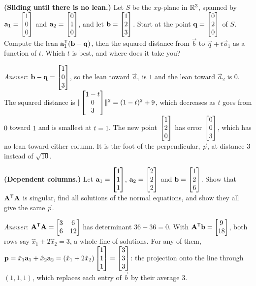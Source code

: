 \begin{exercise}\label{ch18:ex-lean}
\textbf{(Sliding until there is no lean.)} Let $S$ be the $xy$-plane in $\mathbb{R}^3$, spanned by
$\mathbf{a}_1=\begin{bmatrix}1\\0\\0\end{bmatrix}$ and $\mathbf{a}_2=\begin{bmatrix}0\\1\\0\end{bmatrix}$, and let $\mathbf{b}=\begin{bmatrix}1\\2\\3\end{bmatrix}$.
Start at the point $\mathbf{q}=\begin{bmatrix}0\\2\\0\end{bmatrix}$ of $S$. Compute the lean $\mathbf{a}_1^{\mathsf{T}}(\mathbf{b}-\mathbf{q})$,
then the squared distance from $\vec{b}$ to $\vec{q}+t\vec{a}_1$ as a function of $t$. Which $t$ is
best, and where does it take you?

\smallskip
\emph{Answer}: $\mathbf{b}-\mathbf{q}=\begin{bmatrix}1\\0\\3\end{bmatrix}$, so the lean toward $\vec{a}_1$ is $1$ and the
lean toward $\vec{a}_2$ is $0$. The squared distance is
$\lVert\begin{bmatrix}1-t\\0\\3\end{bmatrix}\rVert^2=(1-t)^2+9$, which decreases as $t$ goes from $0$ toward $1$ and is
smallest at $t=1$. The new point $\begin{bmatrix}1\\2\\0\end{bmatrix}$ has error $\begin{bmatrix}0\\0\\3\end{bmatrix}$, which has no lean
toward either column. It is the foot of the perpendicular, $\vec{p}$, at distance $3$ instead of
$\sqrt{10}$.
\end{exercise}

\begin{exercise}\label{ch18:ex-dependent}
\textbf{(Dependent columns.)} Let $\mathbf{a}_1=\begin{bmatrix}1\\1\\1\end{bmatrix}$, $\mathbf{a}_2=\begin{bmatrix}2\\2\\2\end{bmatrix}$ and
$\mathbf{b}=\begin{bmatrix}1\\2\\6\end{bmatrix}$. Show that $\mathbf{A}^{\mathsf{T}}\mathbf{A}$ is singular, find all solutions of the
normal equations, and show they all give the same $\vec{p}$.

\smallskip
\emph{Answer}: $\mathbf{A}^{\mathsf{T}}\mathbf{A}=\begin{bmatrix}3&6\\6&12\end{bmatrix}$ has determinant
$36-36=0$. With $\mathbf{A}^{\mathsf{T}}\mathbf{b}=\begin{bmatrix}9\\18\end{bmatrix}$, both rows say $\hat{x}_1+2\hat{x}_2=3$, a whole
line of solutions. For any of them,
$\mathbf{p}=\hat{x}_1\mathbf{a}_1+\hat{x}_2\mathbf{a}_2=(\hat{x}_1+2\hat{x}_2)\begin{bmatrix}1\\1\\1\end{bmatrix}=\begin{bmatrix}3\\3\\3\end{bmatrix}$:
the projection onto the line through $(1,1,1)$, which replaces each entry of $\vec{b}$ by their
average $3$.
\end{exercise}
